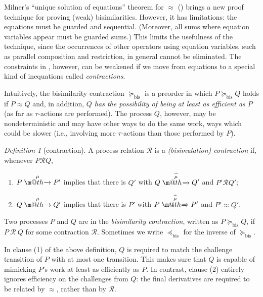 \documentclass[GCNS]{yincog}
\makeatletter
\def \rightarrowfill{$\m@th\mathord{\smash-}\mkern-6mu%
  \cleaders\hbox{$\mkern-2mu\mathord{\smash-}\mkern-2mu$}\hfill
  \mkern-6mu\mathord\rightarrow$}
\def \rightarrowfillWEAK{$\m@th\mathord{\smash=}\mkern-6mu%
  \cleaders\hbox{$\mkern-2mu\mathord{\smash=}\mkern-2mu$}\hfill
  \mkern-6mu\mathord\Rightarrow$}
\theoremstyle{remark}
\newtheorem{definition}{Definition}[section]
\theoremstyle{theorem}
\theoremstyle{remark}
\newcommand{\arr}[1]{\mathrel{\stackrel{{\;\;#1\;\;}}{\mbox{\rightarrowfill}}}}
\newcommand{\arcap}[1]{\mathrel{\stackrel{{\;\; {\widehat{#1}} \;\;}}{\mbox{\rightarrowfill}}}}
\newcommand{\Arcap}[1]{\mathrel{\stackrel{{\;\;{\widehat{#1}}\;\;}}{\mbox{\rightarrowfillWEAK}}}}
\def\Rvtex{\mathcal{R}}
\def\RRvtex{\mathrel{\mathcal{R}}}
\newcommand{\wbvtex}{\approx}
\newcommand{\mcontrBIS}{\mathrel{\succeq_{\mathrm{bis}}}}
\newcommand{\mexpaBIS}{\mathrel{\preceq_{\mathrm{bis}}}}
\makeatother
\begin{document}
Milner's ``unique solution of equations'' theorem for $\wbvtex $ ()
brings a new proof technique for proving (weak) bisimilarities. However,
it has limitations: the equations must be guarded and sequential. (Moreover,
all sums where equation variables appear must be guarded sums.) This limits
the usefulness of the technique, since the occurrences of other operators
using equation variables, such as parallel composition and restriction,
in general cannot be eliminated. The constraints in ,
however, can be weakened if we move from equations to a special kind of
inequations called \emph{contractions}.

Intuitively, the bisimilarity contraction $\mcontrBIS $ is a preorder in
which $P \mcontrBIS Q$ holds if $P \wbvtex Q$ and, in addition,
\emph{$Q$ has the possibility of being at least as efficient as $P$} (as
far as $\tau $-actions are performed). The process $Q$, however, may be
nondeterministic and may have other ways to do the same work, ways which
could be slower (i.e., involving more $\tau $-actions than those performed
by $P$).

\begin{definition}[contraction]
 \label{d:BisCon}
A process relation ${\Rvtex}$ is a \emph{(bisimulation) contraction} if,
whenever $P\RRvtex Q$,
%
\begin{enumerate}
%
\item $P \arr\mu P'$ implies that there is $Q'$ with
$Q \arcap \mu Q'$ and $P' \RRvtex Q'$;
%
\item $Q \arr\mu Q'$ implies that there is $P'$ with
$P \Arcap \mu P'$ and $P' \wbvtex Q'$.
%
\end{enumerate}
%
Two processes $P$ and $Q$ are in the \emph{bisimilarity contraction}, written
as $P \mcontrBIS Q$, if $P\ \Rvtex \ Q$ for some contraction
$\Rvtex $. Sometimes we write $\mexpaBIS $ for the inverse of
$\mcontrBIS $.
\end{definition}
%
In clause (1) of the above definition, $Q$ is required to match the challenge
transition of $P$ with at most one transition. This makes sure that
$Q$ is capable of mimicking $P$'s work at least as efficiently as
$P$. In contrast, clause (2) entirely ignores efficiency on the challenges
from $Q$: the final derivatives are required to be related by
$\wbvtex $, rather than by $\Rvtex $.
\end{document}
